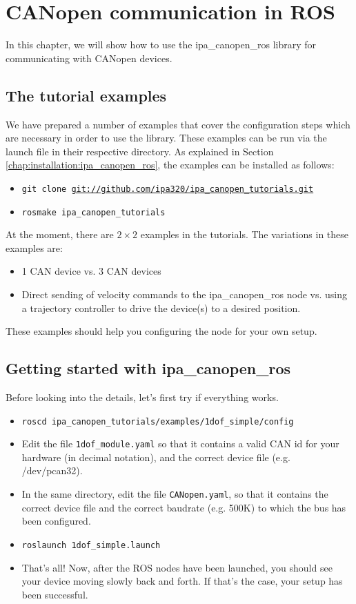 \chapter{CANopen communication in ROS}
\label{chap:roscanopen}

In this chapter, we will show how to use the ipa\_canopen\_ros library for communicating with CANopen devices.

\section{The tutorial examples}

We have prepared a number of examples that cover the configuration steps which are necessary in order to use the library. These examples can be run via the launch file in their respective directory.
As explained in Section \ref{chap:installation:ipa_canopen_ros}, the examples can be installed as follows:

\begin{itemize}
\item \texttt{git clone \url{git://github.com/ipa320/ipa_canopen_tutorials.git}}
\item \texttt{rosmake ipa\_canopen\_tutorials}
\end{itemize}

At the moment, there are $2 \times 2$ examples in the tutorials. The variations in these examples are:
\begin{itemize}
\item 1 CAN device vs. 3 CAN devices
\item Direct sending of velocity commands to the ipa\_canopen\_ros node vs. using a trajectory controller to drive the device(s) to a desired position.
\end{itemize}

These examples should help you configuring the node for your own setup.

\section{Getting started with ipa\_canopen\_ros}

Before looking into the details, let's first try if everything works.

\begin{itemize}
\item \texttt{roscd ipa\_canopen\_tutorials/examples/1dof\_simple/config}
\item Edit the file \texttt{1dof\_module.yaml} so that it contains a valid CAN id for your hardware (in decimal notation), and the correct device file (e.g. /dev/pcan32).
\item In the same directory, edit the file \texttt{CANopen.yaml}, so that it contains the correct device file and the correct baudrate (e.g. 500K) to which the bus has been configured.
\item \texttt{roslaunch 1dof\_simple.launch}
\item That's all! Now, after the ROS nodes have been launched, you should see your device moving slowly back and forth. If that's the case, your setup has been successful.
\end{itemize}

